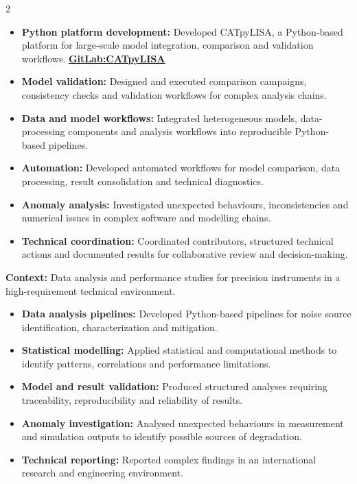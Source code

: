 \documentclass[8pt,a4paper,ragged2e,withhyper]{altacv}
\begin{document}
\begin{paracol}{2}
\begin{itemize}
\item \textbf{Python platform development:} Developed CATpyLISA, a Python-based platform for large-scale model integration, comparison and validation workflows. \textcolor{DarkPastelRed}{\href{https://gitlab.oca.eu/gboileau/lisa_l3_tools}{\bf GitLab:CATpyLISA}}
\item \textbf{Model validation:} Designed and executed comparison campaigns, consistency checks and validation workflows for complex analysis chains.
\item \textbf{Data and model workflows:} Integrated heterogeneous models, data-processing components and analysis workflows into reproducible Python-based pipelines.
\item \textbf{Automation:} Developed automated workflows for model comparison, data processing, result consolidation and technical diagnostics.
\item \textbf{Anomaly analysis:} Investigated unexpected behaviours, inconsistencies and numerical issues in complex software and modelling chains.
\item \textbf{Technical coordination:} Coordinated contributors, structured technical actions and documented results for collaborative review and decision-making.
\end{itemize}

\divider


\textbf{Context:} Data analysis and performance studies for precision instruments in a high-requirement technical environment.

\begin{itemize}
\item \textbf{Data analysis pipelines:} Developed Python-based pipelines for noise source identification, characterization and mitigation.
\item \textbf{Statistical modelling:} Applied statistical and computational methods to identify patterns, correlations and performance limitations.
\item \textbf{Model and result validation:} Produced structured analyses requiring traceability, reproducibility and reliability of results.
\item \textbf{Anomaly investigation:} Analysed unexpected behaviours in measurement and simulation outputs to identify possible sources of degradation.
\item \textbf{Technical reporting:} Reported complex findings in an international research and engineering environment.
\end{itemize}


\end{paracol}
\end{document}
